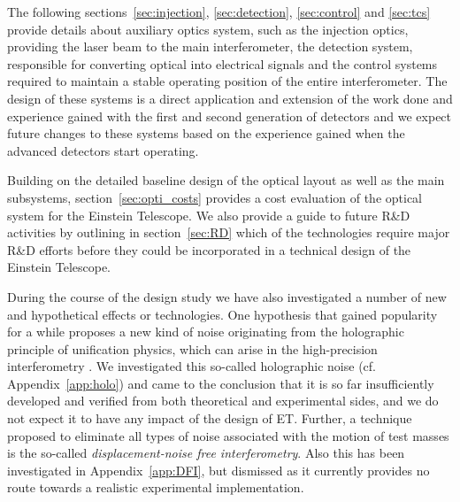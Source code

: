 The following sections~\ref{sec:injection}, \ref{sec:detection}, \ref{sec:control}
and \ref{sec:tcs} provide details about auxiliary optics system, such as the
injection
optics, providing the laser beam to the main interferometer, the
detection system, responsible for converting optical into electrical
signals and the control systems required to maintain a stable
operating position of the entire interferometer. The design of these
systems is a direct application and extension of the work done 
and experience gained with the first and second generation of 
detectors and we expect future changes to these systems based
on the experience gained when the advanced detectors
start operating. 

Building on the detailed baseline design of the optical layout as well as
the main subsystems, section~\ref{sec:opti_costs}  provides a cost
evaluation of the optical
system for the Einstein Telescope. We also provide 
a guide to future R\&D activities by outlining in section~\ref{sec:RD} 
which of the technologies require
major R\&D efforts before they could be incorporated in a technical  
design of the Einstein Telescope.


During the course of the design study we have also investigated a
number of new and hypothetical effects or technologies. One 
hypothesis that gained popularity for a while proposes a new kind of
noise originating 
from the holographic principle of unification physics, which can arise in the 
high-precision interferometry \cite{2009_holonoise}. We investigated
this so-called holographic 
noise (cf. Appendix~\ref{app:holo}) and came to the conclusion that it
is so far insufficiently developed and verified from both theoretical
and experimental sides, and we do not expect it to have any impact of
the design of ET. 
Further, a technique proposed to eliminate all types of
noise associated with the motion of test masses is the so-called
\emph{displacement-noise free interferometry}. Also this has been
investigated in Appendix~\ref{app:DFI}, but dismissed as it currently provides no route towards
a realistic experimental implementation. 
